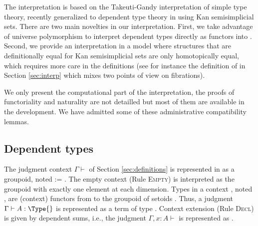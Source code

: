 
\begin{coqdoccode}
\end{coqdoccode}


  The interpretation is based on the Takeuti-Gandy interpretation of
  simple type theory, recently generalized to dependent type theory in
  \cite{barras:_gener_takeut_gandy_inter} using Kan semisimplicial
  sets. There are two main novelties in our interpretation. First, we
  take advantage of universe polymorphism to interpret dependent types
  directly as functors into . Second, we provide an
  interpretation in a model where structures that are definitionally
  equal for Kan semisimplicial sets are only homotopically equal, which
  requires more care in the definitions (see for instance the definition
  of  in Section \ref{sec:interp} which mixes two points of view
  on fibrations).


  We only present the computational part of the interpretation, the
  proofs of functoriality and naturality are not detailled but most of
  them are available in the \Coq development. We have admitted some of
  these administrative compatibility lemmas.


\subsection{Dependent types}




  The judgment context $\Gamma \vdash$ of Section
  \ref{sec:definitions} is represented in \Coq as a groupoid, noted
   := . The empty context (Rule \textsc{Empty})
  is interpreted as the groupoid with exactly one element at each
  dimension.  Types in a context , noted  , are (context)
  functors from  to the groupoid of setoids .  Thus, a
  judgment $\Gamma \vdash A : \Type{}$ is represented as a term  of
  type  . Context extension (Rule \textsc{Decl}) is given by
  dependent sums, i.e., the judgment $\Gamma, x:A \vdash$ is represented
  as \coqdocdefinition{$\Sigma$} .


